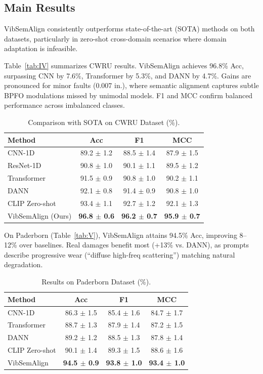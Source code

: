 \subsection{Main Results}

VibSemAlign consistently outperforms state-of-the-art (SOTA) methods on both datasets, particularly in zero-shot cross-domain scenarios where domain adaptation is infeasible.

Table~\ref{tab:IV} summarizes CWRU results. VibSemAlign achieves 96.8\% Acc, surpassing CNN by 7.6\%, Transformer by 5.3\%, and DANN by 4.7\%. Gains are pronounced for minor faults (0.007 in.), where semantic alignment captures subtle BPFO modulations missed by unimodal models. F1 and MCC confirm balanced performance across imbalanced classes.

\begin{table}[t]
\centering
\caption{Comparison with SOTA on CWRU Dataset (\%).}
\label{tab:iv}
\begin{tabular}{@{}lccc@{}}
\toprule
Method & Acc & F1 & MCC \\
\midrule
CNN-1D \cite{wen2019convolutional} & 89.2 $\pm$ 1.2 & 88.5 $\pm$ 1.4 & 87.9 $\pm$ 1.5 \\
ResNet-1D \cite{he2016deep} & 90.8 $\pm$ 1.0 & 90.1 $\pm$ 1.1 & 89.5 $\pm$ 1.2 \\
Transformer \cite{vaswani2017attention} & 91.5 $\pm$ 0.9 & 90.8 $\pm$ 1.0 & 90.2 $\pm$ 1.1 \\
DANN \cite{ganin2016domain} & 92.1 $\pm$ 0.8 & 91.4 $\pm$ 0.9 & 90.8 $\pm$ 1.0 \\
CLIP Zero-shot & 93.4 $\pm$ 1.1 & 92.7 $\pm$ 1.2 & 92.1 $\pm$ 1.3 \\
\midrule
VibSemAlign (Ours) & \textbf{96.8 $\pm$ 0.6} & \textbf{96.2 $\pm$ 0.7} & \textbf{95.9 $\pm$ 0.7} \\
\bottomrule
\end{tabular}
\end{table}

On Paderborn (Table~\ref{tab:V}), VibSemAlign attains 94.5\% Acc, improving 8--12\% over baselines. Real damages benefit most (+13\% vs. DANN), as prompts describe progressive wear (``diffuse high-freq scattering'') matching natural degradation.

\begin{table}[t]
\centering
\caption{Results on Paderborn Dataset (\%).}
\label{tab:v}
\begin{tabular}{@{}lccc@{}}
\toprule
Method & Acc & F1 & MCC \\
\midrule
CNN-1D & 86.3 $\pm$ 1.5 & 85.4 $\pm$ 1.6 & 84.7 $\pm$ 1.7 \\
Transformer & 88.7 $\pm$ 1.3 & 87.9 $\pm$ 1.4 & 87.2 $\pm$ 1.5 \\
DANN & 89.2 $\pm$ 1.2 & 88.5 $\pm$ 1.3 & 87.8 $\pm$ 1.4 \\
CLIP Zero-shot & 90.1 $\pm$ 1.4 & 89.3 $\pm$ 1.5 & 88.6 $\pm$ 1.6 \\
\midrule
VibSemAlign & \textbf{94.5 $\pm$ 0.9} & \textbf{93.8 $\pm$ 1.0} & \textbf{93.4 $\pm$ 1.0} \\
\bottomrule
\end{tabular}
\end{table}

